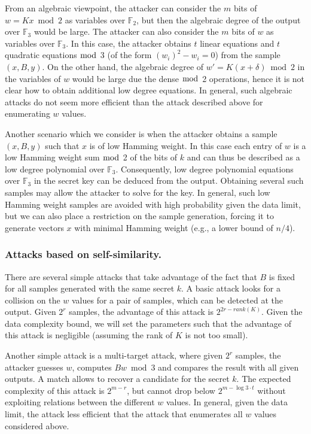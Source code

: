 \documentclass[orivec,envcountsect]{llncs}
\begin{document}
From an algebraic viewpoint, the attacker can consider the $m$ bits of $w = K x \bmod 2$ as variables over $\mathbb{F}_2$,
but then the algebraic degree of the output over $\mathbb{F}_3$ would be large.
The attacker can also consider the $m$ bits of $w$ as variables over $\mathbb{F}_3$.
In this case, the attacker obtains $t$ linear equations and $t$ quadratic equations $\bmod$ 3 (of the form $(w_i)^2 - w_i = 0$) from the sample $(x,B,y)$.
On the other hand, the algebraic degree of $w' = K (x +\delta) \bmod 2$ in the variables of $w$ would be large due the dense $\bmod$ 2 operations,
hence it is not clear how to obtain additional low degree equations.
In general, such algebraic attacks do not seem more efficient than the attack described above for enumerating $w$ values.

Another scenario which we consider is when the attacker obtains a sample $(x,B,y)$
such that $x$ is of low Hamming weight. In this case each entry of $w$ is a low Hamming weight sum $\bmod$ 2
of the bits of $k$ and can thus be described as a low degree polynomial over $\mathbb{F}_3$.
Consequently, low degree polynomial equations over $\mathbb{F}_3$ in the secret key can be deduced from the output.
Obtaining several such samples may allow the attacker to solve for the key.
In general, such low Hamming weight samples are avoided with high probability given the data limit,
but we can also place a restriction on the sample generation, forcing it to generate vectors $x$
with minimal Hamming weight (e.g., a lower bound of $n/4$).



\subsubsection{Attacks based on self-similarity.}


There are several simple attacks that take advantage of the fact that $B$ is fixed for all samples generated with the same secret $k$.
A basic attack looks for a collision on the $w$ values for a pair of samples, which can be detected at the output.
Given $2^r$ samples, the advantage of this attack is $2^{2r - rank(K)}$. Given the data complexity bound,
we will set the parameters such that the advantage of this attack is negligible (assuming the rank of $K$ is not too small).

Another simple attack is a multi-target attack, where given $2^r$ samples, the attacker guesses $w$, computes $B w \bmod 3$ and compares the result with all given outputs. A match allows to recover a candidate for the secret $k$.
The expected complexity of this attack is $2^{m-r}$, but cannot drop below $2^{m - \log 3 \cdot t}$ without exploiting relations between the different $w$ values. In general, given the data limit, the attack less efficient that the attack that enumerates all $w$ values considered above.
\end{document}
